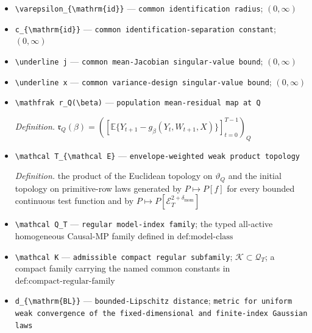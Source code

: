 \documentclass{article}
\begin{document}
\begin{itemize}
  \item \texttt{\textbackslash{}\allowbreak{}varepsilon\_\allowbreak{}\{\textbackslash{}\allowbreak{}mathrm\{id\}\allowbreak{}\}\allowbreak{}} --- \texttt{common identification radius}; \((0,\infty)\)
  \item \texttt{c\_\allowbreak{}\{\textbackslash{}\allowbreak{}mathrm\{id\}\allowbreak{}\}\allowbreak{}} --- \texttt{common identification-\allowbreak{}separation constant}; \((0,\infty)\)
  \item \texttt{\textbackslash{}\allowbreak{}underline j} --- \texttt{common mean-\allowbreak{}Jacobian singular-\allowbreak{}value bound}; \((0,\infty)\)
  \item \texttt{\textbackslash{}\allowbreak{}underline x} --- \texttt{common variance-\allowbreak{}design singular-\allowbreak{}value bound}; \((0,\infty)\)
  \item \texttt{\textbackslash{}\allowbreak{}mathfrak r\_\allowbreak{}Q(\textbackslash{}\allowbreak{}beta)} --- \texttt{population mean-\allowbreak{}residual map at Q}
  \par\smallskip\noindent\emph{Definition.} \(\mathfrak r_Q(\beta)=([\mathbb E\{Y_{t+1}-g_\beta(Y_t,W_{t+1},X)\}]_{t=0}^{T-1})_Q\)
  \item \texttt{\textbackslash{}\allowbreak{}mathcal T\_\allowbreak{}\{\textbackslash{}\allowbreak{}mathcal E\}\allowbreak{}} --- \texttt{envelope-\allowbreak{}weighted weak product topology}
  \par\smallskip\noindent\emph{Definition.} the product of the Euclidean topology on \(\vartheta_Q\) and the initial topology on primitive-row laws generated by \(P\mapsto P[f]\) for every bounded continuous test function and by \(P\mapsto P[\mathcal E_T^{2+\delta_{\mathrm{mom}}}]\)
  \item \texttt{\textbackslash{}\allowbreak{}mathcal Q\_\allowbreak{}T} --- \texttt{regular model-\allowbreak{}index family}; the typed all-active homogeneous Causal-MP family defined in \(\text{def:model-class}\)
  \item \texttt{\textbackslash{}\allowbreak{}mathcal K} --- \texttt{admissible compact regular subfamily}; \(\mathcal K\subset\mathcal Q_T\); a compact family carrying the named common constants in \(\text{def:compact-regular-family}\)
  \item \texttt{d\_\allowbreak{}\{\textbackslash{}\allowbreak{}mathrm\{BL\}\allowbreak{}\}\allowbreak{}} --- \texttt{bounded-\allowbreak{}Lipschitz distance}; \texttt{metric for uniform weak convergence of the fixed-\allowbreak{}dimensional and finite-\allowbreak{}index Gaussian laws}
\end{itemize}
\end{document}
